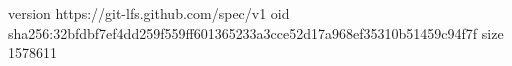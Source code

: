 version https://git-lfs.github.com/spec/v1
oid sha256:32bfdbf7ef4dd259f559ff601365233a3cce52d17a968ef35310b51459c94f7f
size 1578611
